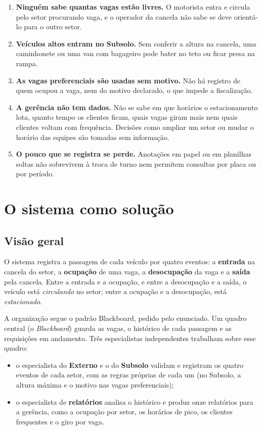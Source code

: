\begin{enumerate}
  \item \textbf{Ninguém sabe quantas vagas estão livres.} O motorista entra e circula pelo setor procurando vaga, e o operador da cancela não sabe se deve orientá-lo para o outro setor.
  \item \textbf{Veículos altos entram no Subsolo.} Sem conferir a altura na cancela, uma caminhonete ou uma van com bagageiro pode bater no teto ou ficar presa na rampa.
  \item \textbf{As vagas preferenciais são usadas sem motivo.} Não há registro de quem ocupou a vaga, nem do motivo declarado, o que impede a fiscalização.
  \item \textbf{A gerência não tem dados.} Não se sabe em que horários o estacionamento lota, quanto tempo os clientes ficam, quais vagas giram mais nem quais clientes voltam com frequência. Decisões como ampliar um setor ou mudar o horário das equipes são tomadas sem informação.
  \item \textbf{O pouco que se registra se perde.} Anotações em papel ou em planilhas soltas não sobrevivem à troca de turno nem permitem consultas por placa ou por período.
\end{enumerate}

\section{O sistema como solução}
\label{sec:solucao}

\subsection{Visão geral}

O sistema registra a passagem de cada veículo por quatro eventos: a \textbf{entrada} na cancela do setor, a \textbf{ocupação} de uma vaga, a \textbf{desocupação} da vaga e a \textbf{saída} pela cancela. Entre a entrada e a ocupação, e entre a desocupação e a saída, o veículo está \emph{circulando} no setor; entre a ocupação e a desocupação, está \emph{estacionado}.

A organização segue o padrão Blackboard, pedido pelo enunciado. Um quadro central (o \emph{Blackboard}) guarda as vagas, o histórico de cada passagem e as requisições em andamento. Três especialistas independentes trabalham sobre esse quadro:

\begin{itemize}
  \item o especialista do \textbf{Externo} e o do \textbf{Subsolo} validam e registram os quatro eventos de cada setor, com as regras próprias de cada um (no Subsolo, a altura máxima e o motivo nas vagas preferenciais);
  \item o especialista de \textbf{relatórios} analisa o histórico e produz onze relatórios para a gerência, como a ocupação por setor, os horários de pico, os clientes frequentes e o giro por vaga.
\end{itemize}

